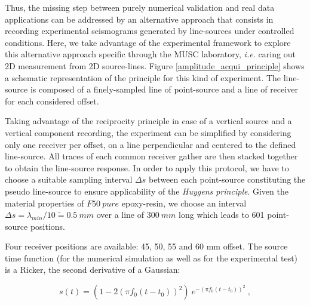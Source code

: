 \documentclass[manuscript,revised]{geophysics}
\begin{document}
\noindent Thus, the missing step between purely numerical validation and real data applications can be addressed by an alternative approach that consists in recording experimental seismograms generated by line-sources under controlled conditions. Here, we take advantage of the experimental framework to explore this alternative approach specific through the MUSC laboratory, \textit{i.e.} caring out 2D measurement from 2D source-lines. Figure \ref{amplitude_acqui_principle} shows a schematic representation of the principle for this kind of experiment. The line-source is composed of a finely-sampled line of point-source and a line of receiver for each considered offset. 
 
\noindent Taking advantage of the reciprocity principle in case of a vertical source and a vertical component recording, the experiment can be simplified by considering only one receiver per offset, on a line perpendicular and centered to the defined line-source. All traces of each common receiver gather are then stacked together to obtain the line-source response. In order to apply this protocol, we have to choose a suitable sampling interval $\Delta s$ between each point-source constituting the pseudo line-source to ensure applicability of the \textit{Huygens principle}. Given the material properties of $F50\ pure$ epoxy-resin, we choose an interval $\Delta s=\lambda_{min}/10 \tilde{=}0.5\ mm$ over a line of $300\ mm$ long which leads to 601 point-source positions.

Four receiver positions are available: 45, 50, 55 and 60 mm offset. The source time function (for the numerical simulation as well as for the experimental test) is a Ricker, the second derivative of a Gaussian:

\begin{equation}
	s(t) = (1-2(\pi f_{0}(t-t_{0}))^{2})~e^{-(\pi f_{0}(t-t_{0}))^{2}}~,
	\label{eq:ricker-source} 
\end{equation}
\end{document}
